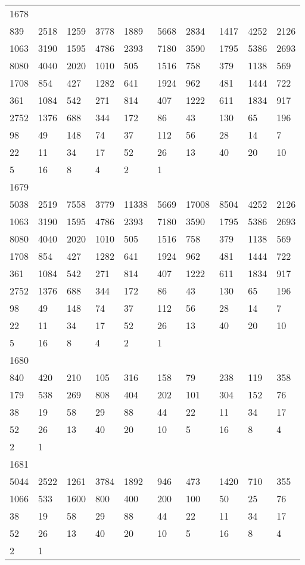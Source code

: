 \begin{longtable}{*{10}{l}}
1678&&&&&&&&&\\
839& 2518& 1259& 3778& 1889& 5668& 2834& 1417& 4252& 2126\\
1063& 3190& 1595& 4786& 2393& 7180& 3590& 1795& 5386& 2693\\
8080& 4040& 2020& 1010& 505& 1516& 758& 379& 1138& 569\\
1708& 854& 427& 1282& 641& 1924& 962& 481& 1444& 722\\
361& 1084& 542& 271& 814& 407& 1222& 611& 1834& 917\\
2752& 1376& 688& 344& 172& 86& 43& 130& 65& 196\\
98& 49& 148& 74& 37& 112& 56& 28& 14& 7\\
22& 11& 34& 17& 52& 26& 13& 40& 20& 10\\
5& 16& 8& 4& 2& 1& \\

1679&&&&&&&&&\\
5038& 2519& 7558& 3779& 11338& 5669& 17008& 8504& 4252& 2126\\
1063& 3190& 1595& 4786& 2393& 7180& 3590& 1795& 5386& 2693\\
8080& 4040& 2020& 1010& 505& 1516& 758& 379& 1138& 569\\
1708& 854& 427& 1282& 641& 1924& 962& 481& 1444& 722\\
361& 1084& 542& 271& 814& 407& 1222& 611& 1834& 917\\
2752& 1376& 688& 344& 172& 86& 43& 130& 65& 196\\
98& 49& 148& 74& 37& 112& 56& 28& 14& 7\\
22& 11& 34& 17& 52& 26& 13& 40& 20& 10\\
5& 16& 8& 4& 2& 1& \\

1680&&&&&&&&&\\
840& 420& 210& 105& 316& 158& 79& 238& 119& 358\\
179& 538& 269& 808& 404& 202& 101& 304& 152& 76\\
38& 19& 58& 29& 88& 44& 22& 11& 34& 17\\
52& 26& 13& 40& 20& 10& 5& 16& 8& 4\\
2& 1& \\

1681&&&&&&&&&\\
5044& 2522& 1261& 3784& 1892& 946& 473& 1420& 710& 355\\
1066& 533& 1600& 800& 400& 200& 100& 50& 25& 76\\
38& 19& 58& 29& 88& 44& 22& 11& 34& 17\\
52& 26& 13& 40& 20& 10& 5& 16& 8& 4\\
2& 1& \\


\end{longtable}
